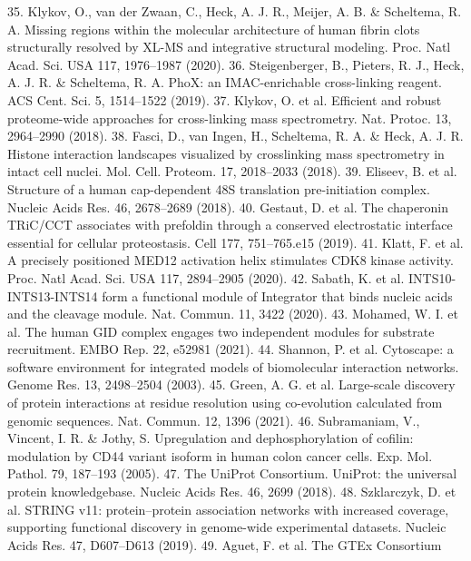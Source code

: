 35.	 Klykov, O., van der Zwaan, C., Heck, A. J. R., Meijer, A. B.
\& Scheltema, R. A. Missing regions within the molecular
architecture of human fibrin clots structurally resolved by XL-MS
and integrative structural modeling. Proc. Natl Acad. Sci. USA 117,
1976–1987 (2020).
36.	 Steigenberger, B., Pieters, R. J., Heck, A. J. R. \& Scheltema, R. A.
PhoX: an IMAC-enrichable cross-linking reagent. ACS Cent. Sci. 5,
1514–1522 (2019).
37.	 Klykov, O. et al. Efficient and robust proteome-wide approaches
for cross-linking mass spectrometry. Nat. Protoc. 13, 2964–2990
(2018).
38.	 Fasci, D., van Ingen, H., Scheltema, R. A. \& Heck, A. J. R. Histone
interaction landscapes visualized by crosslinking mass spectrometry
in intact cell nuclei. Mol. Cell. Proteom. 17, 2018–2033 (2018).
39.	 Eliseev, B. et al. Structure of a human cap-dependent 48S
translation pre-initiation complex. Nucleic Acids Res. 46,
2678–2689 (2018).
40.	 Gestaut, D. et al. The chaperonin TRiC/CCT associates with
prefoldin through a conserved electrostatic interface essential for
cellular proteostasis. Cell 177, 751–765.e15 (2019).
41.	 Klatt, F. et al. A precisely positioned MED12 activation helix
stimulates CDK8 kinase activity. Proc. Natl Acad. Sci. USA 117,
2894–2905 (2020).
42.	 Sabath, K. et al. INTS10-INTS13-INTS14 form a functional module
of Integrator that binds nucleic acids and the cleavage module.
Nat. Commun. 11, 3422 (2020).
43.	 Mohamed, W. I. et al. The human GID complex engages two
independent modules for substrate recruitment. EMBO Rep. 22,
e52981 (2021).
44.	 Shannon, P. et al. Cytoscape: a software environment for
integrated models of biomolecular interaction networks. Genome
Res. 13, 2498–2504 (2003).
45.	 Green, A. G. et al. Large-scale discovery of protein interactions at
residue resolution using co-evolution calculated from genomic
sequences. Nat. Commun. 12, 1396 (2021).
46.	 Subramaniam, V., Vincent, I. R. \& Jothy, S. Upregulation and
dephosphorylation of cofilin: modulation by CD44 variant isoform
in human colon cancer cells. Exp. Mol. Pathol. 79, 187–193 (2005).
47.	 The UniProt Consortium. UniProt: the universal protein
knowledgebase. Nucleic Acids Res. 46, 2699 (2018).
48.	 Szklarczyk, D. et al. STRING v11: protein–protein association
networks with increased coverage, supporting functional
discovery in genome-wide experimental datasets. Nucleic Acids
Res. 47, D607–D613 (2019).
49.	 Aguet, F. et al. The GTEx Consortium 

